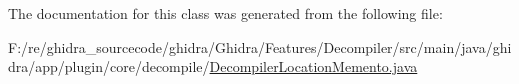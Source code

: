 The documentation for this class was generated from the following file\+:\begin{DoxyCompactItemize}
\item 
F\+:/re/ghidra\+\_\+sourcecode/ghidra/\+Ghidra/\+Features/\+Decompiler/src/main/java/ghidra/app/plugin/core/decompile/\mbox{\hyperlink{_decompiler_location_memento_8java}{Decompiler\+Location\+Memento.\+java}}\end{DoxyCompactItemize}

